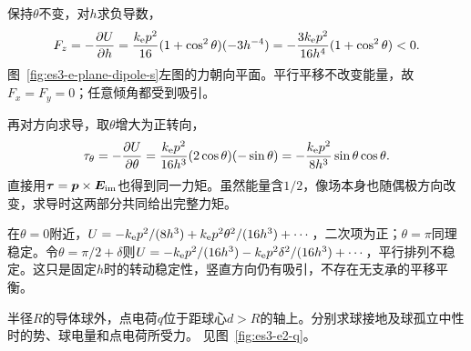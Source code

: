 \begin{solution}
保持$\theta$不变，对$h$求负导数，
\[F_z=-\frac{\partial U}{\partial h}
=\frac{k_{\rm e} p^2}{16}(1+\cos^2\theta)(-3h^{-4})
=-\frac{3k_{\rm e} p^2}{16h^4}(1+\cos^2\theta)<0.
\]
图~\ref{fig:es3-e-plane-dipole-s}左图的力朝向平面。平行平移不改变能量，故$F_x=F_y=0$；任意倾角都受到吸引。

再对方向求导，取$\theta$增大为正转向，
\[\tau_\theta=-\frac{\partial U}{\partial\theta}
=\frac{k_{\rm e} p^2}{16h^3}(2\cos\theta)(-\sin\theta)
=-\frac{k_{\rm e} p^2}{8h^3}\sin\theta\cos\theta.
\]
直接用$\bm{\tau}=\bm{p}\times\bm{E}_{\rm im}$也得到同一力矩。虽然能量含$1/2$，像场本身也随偶极方向改变，求导时这两部分共同给出完整力矩。

在$\theta=0$附近，$U=-k_{\rm e} p^2/(8h^3)+k_{\rm e} p^2\theta^2/(16h^3)+\cdots$，二次项为正；$\theta=\pi$同理稳定。令$\theta=\pi/2+\delta$则$U=-k_{\rm e} p^2/(16h^3)-k_{\rm e} p^2\delta^2/(16h^3)+\cdots$，平行排列不稳定。这只是固定$h$时的转动稳定性，竖直方向仍有吸引，不存在无支承的平移平衡。

\end{solution}


\begin{example}[接地球与中性孤立球]\label{ex:es3-e2}
半径$R$的导体球外，点电荷$q$位于距球心$d>R$的轴上。分别求球接地及球孤立中性时的势、球电量和点电荷所受力。 见图~\ref{fig:es3-e2-q}。
\end{example}


